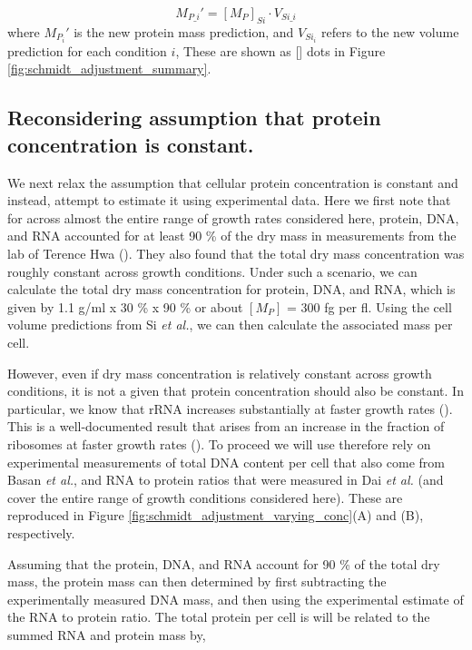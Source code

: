 \begin{equation}
	M_{P\_i}' = [M_P]_{Si} \cdot V_{Si\_i}
\end{equation}
where $M_{P_i}'$ is the new protein mass prediction, and $V_{Si_i}$ refers to the new volume prediction for each condition $i$,
These are shown as [] dots in Figure \ref{fig:schmidt_adjustment_summary}.


\subsection{Reconsidering assumption that protein concentration is constant.}

We next relax the assumption that cellular protein concentration is constant and
instead, attempt to  estimate it using experimental data. Here we first note
that  for across almost the entire range of growth rates considered here,
protein, DNA, and RNA accounted for at least 90 \% of the dry mass in
measurements from the lab of Terence Hwa (\cite{basan2015}). They also found that
the total dry mass concentration was roughly constant across growth conditions.
Under such a scenario, we can calculate the total dry mass concentration for
protein, DNA, and RNA, which is given by 1.1 g/ml x 30 \% x 90 \% or about
$[M_P]$ = 300 fg per fl. Using the cell volume predictions from Si \textit{et
al.}, we can then calculate the associated mass per cell.

However, even if dry mass concentration is relatively constant across growth
conditions, it is not a given that protein concentration should also be
constant. In particular, we know that rRNA increases substantially at faster
growth rates (\cite{dai2016}). This is a well-documented result that arises from
an increase in the fraction of ribosomes at faster growth rates
(\cite{scott2010}). To proceed we will use therefore rely on experimental
measurements of total DNA content per cell that also come from Basan \textit{et al.},
and RNA to protein ratios that were measured in Dai \textit{et al.} (and cover the entire range of growth conditions considered here). These are
reproduced in Figure \ref{fig:schmidt_adjustment_varying_conc}(A) and (B),
respectively.

Assuming that the protein, DNA, and RNA account for 90 \% of the total dry mass,
the protein mass can then determined by first subtracting the experimentally measured DNA mass,  and then using the experimental estimate of the RNA to protein ratio. The total protein per cell is will be related to the summed RNA and protein mass by,

